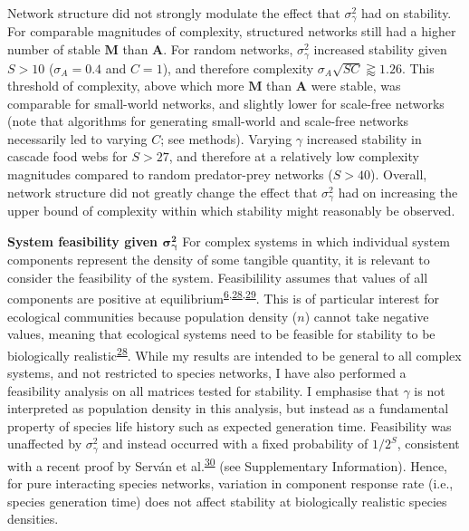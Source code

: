 \documentclass[]{article}
\begin{document}
Network structure did not strongly modulate the effect that
\(\sigma^{2}_{\gamma}\) had on stability. For comparable magnitudes of
complexity, structured networks still had a higher number of stable
\(\mathbf{M}\) than \(\mathbf{A}\). For random networks,
\(\sigma^{2}_{\gamma}\) increased stability given \(S > 10\)
(\(\sigma_{A} = 0.4\) and \(C = 1\)), and therefore complexity
\(\sigma_{A} \sqrt{SC} \gtrapprox 1.26\). This threshold of complexity,
above which more \(\mathbf{M}\) than \(\mathbf{A}\) were stable, was
comparable for small-world networks, and slightly lower for scale-free
networks (note that algorithms for generating small-world and scale-free
networks necessarily led to varying \(C\); see methods). Varying
\(\gamma\) increased stability in cascade food webs for \(S > 27\), and
therefore at a relatively low complexity magnitudes compared to random
predator-prey networks (\(S > 40\)). Overall, network structure did not
greatly change the effect that \(\sigma^{2}_{\gamma}\) had on increasing
the upper bound of complexity within which stability might reasonably be
observed.

\textbf{System feasibility given \(\mathbf{\sigma^{2}_{\gamma}}\)} For
complex systems in which individual system components represent the
density of some tangible quantity, it is relevant to consider the
feasibility of the system. Feasibilility assumes that values of all
components are positive at
equilibrium\textsuperscript{\protect\hyperlink{ref-Grilli2017}{6},\protect\hyperlink{ref-Dougoud2018}{28},\protect\hyperlink{ref-Song2018}{29}}.
This is of particular interest for ecological communities because
population density (\(n\)) cannot take negative values, meaning that
ecological systems need to be feasible for stability to be biologically
realistic\textsuperscript{\protect\hyperlink{ref-Dougoud2018}{28}}.
While my results are intended to be general to all complex systems, and
not restricted to species networks, I have also performed a feasibility
analysis on all matrices tested for stability. I emphasise that
\(\gamma\) is not interpreted as population density in this analysis,
but instead as a fundamental property of species life history such as
expected generation time. Feasibility was unaffected by
\(\sigma^{2}_{\gamma}\) and instead occurred with a fixed probability of
\(1/2^{S}\), consistent with a recent proof by Serván et
al.\textsuperscript{\protect\hyperlink{ref-Servan2018}{30}} (see
Supplementary Information). Hence, for pure interacting species
networks, variation in component response rate (i.e., species generation
time) does not affect stability at biologically realistic species
densities.
\end{document}
